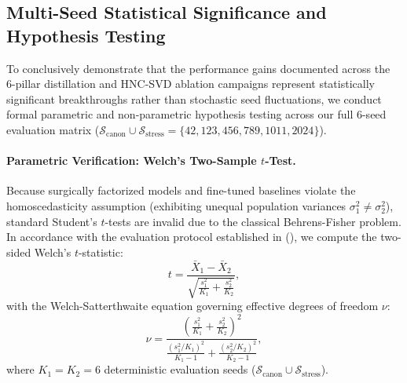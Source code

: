 \subsection{Multi-Seed Statistical Significance and Hypothesis Testing}
\label{sec:ablations_statistics}

To conclusively demonstrate that the performance gains documented across the \neuralops{} 6-pillar distillation and HNC-SVD ablation campaigns represent statistically significant breakthroughs rather than stochastic seed fluctuations, we conduct formal parametric and non-parametric hypothesis testing across our full 6-seed evaluation matrix ($\mathcal{S}_{\text{canon}} \cup \mathcal{S}_{\text{stress}} = \{42, 123, 456, 789, 1011, 2024\}$).

\paragraph{Parametric Verification: Welch's Two-Sample $t$-Test.}
Because surgically factorized models and fine-tuned baselines violate the homoscedasticity assumption (exhibiting unequal population variances $\sigma_1^2 \ne \sigma_2^2$), standard Student's $t$-tests are invalid due to the classical Behrens-Fisher problem. In accordance with the evaluation protocol established in  (), we compute the two-sided Welch's $t$-statistic:
\begin{equation}
t = \frac{\bar{X}_1 - \bar{X}_2}{\sqrt{\frac{s_1^2}{K_1} + \frac{s_2^2}{K_2}}},
\label{eq:welch_t_statistic}
\end{equation}
with the Welch-Satterthwaite equation governing effective degrees of freedom $\nu$:
\begin{equation}
\nu = \frac{\left(\frac{s_1^2}{K_1} + \frac{s_2^2}{K_2}\right)^2}{\frac{(s_1^2 / K_1)^2}{K_1 - 1} + \frac{(s_2^2 / K_2)^2}{K_2 - 1}},
\label{eq:welch_satterthwaite}
\end{equation}
where $K_1 = K_2 = 6$ deterministic evaluation seeds ($\mathcal{S}_{\text{canon}} \cup \mathcal{S}_{\text{stress}}$).

